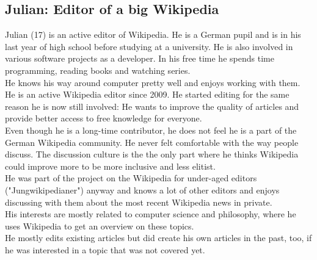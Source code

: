 \subsection{Julian: Editor of a big Wikipedia}
Julian (17) is an active editor of Wikipedia. He is a German pupil and is in his last year of high school before studying at a university. He is also involved in various software projects as a developer. In his free time he spends time programming, reading books and watching series. \\
He knows his way around computer pretty well and enjoys working with them. \\
He is an active Wikipedia editor since 2009. He started editing for the same reason he is now still involved: He wants to improve the quality of articles and provide better access to free knowledge for everyone. \\
Even though he is a long-time contributor, he does not feel he is a part of the German Wikipedia community. He never felt comfortable with the way people discuss. The discussion culture is the the only part where he thinks Wikipedia could improve more to be more inclusive and less elitist. \\
He was part of the project on the Wikipedia for under-aged editors ("Jungwikipedianer") anyway and knows a lot of other editors and enjoys discussing with them about the most recent Wikipedia news in private. \\
His interests are mostly related to computer science and philosophy, where he uses Wikipedia to get an overview on these topics. \\
He mostly edits existing articles but did create his own articles in the past, too, if he was interested in a topic that was not covered yet.

